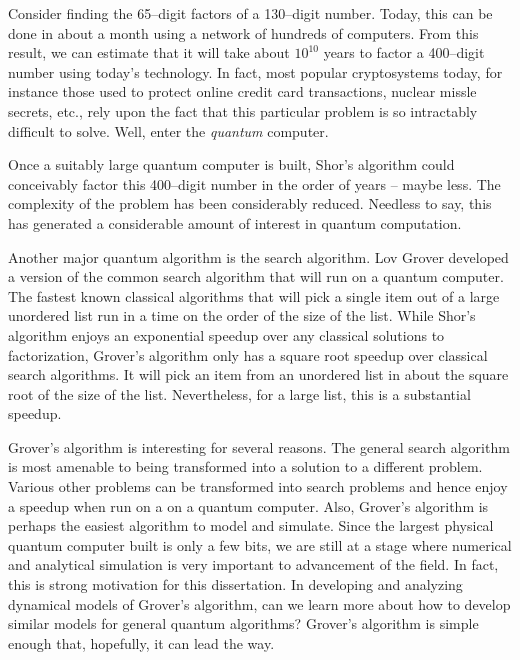 Consider finding the 65--digit factors of a 130--digit number.
Today, this can be done in about a month using a network of hundreds 
of computers.  From this result, we can estimate that it will take about 
$10^{10}$ years to factor a 400--digit number using today's technology.
In fact, most popular cryptosystems today, for instance those used to 
protect online credit card transactions, nuclear missle secrets, etc., 
rely upon the fact that this particular problem is so intractably 
difficult to solve.  Well, enter the {\sl quantum} computer.  

Once a suitably large quantum computer is built, Shor's algorithm could 
conceivably factor this 400--digit number in the order of years --
maybe less.  The complexity of the problem has been considerably reduced.
Needless to say, this has generated a considerable amount of interest in 
quantum computation.

Another major quantum algorithm is the search algorithm.  Lov
Grover\cite{Grover:96a} developed a version of the common
search
algorithm that will run on a quantum computer.  
The fastest known classical algorithms that will pick a single item out of
a large unordered list run in a time on the order of the size of the list.
While Shor's algorithm enjoys an exponential speedup over any classical 
solutions to factorization, Grover's algorithm only has a square root speedup
over classical search algorithms.  It will pick an item from an unordered
list in about the square root of the size of the list.  Nevertheless, for
a large list, this is a substantial speedup.

Grover's algorithm is interesting for several reasons.  The general search
algorithm is most amenable to being transformed into a solution to a different
problem.  Various other problems can be transformed into search problems and hence
enjoy a speedup when run on a on a quantum
computer\cite{Durr/Hoyer:96,Grover:96b,Grover:97,Brassard/Hoyer/Tapp:97,
Terhal/Smolin:98,Brassard/Hoyer/Tapp:98,Cerf/Grover/Williams:98,Farhi/Gutmann:98}.
Also, Grover's algorithm is perhaps the easiest algorithm to model and simulate.
Since the largest physical quantum computer built is only a few bits, we
are still at a stage where numerical and analytical simulation is very 
important to advancement of the field.  In fact, this is strong motivation
for this dissertation.  In developing and analyzing dynamical models of 
Grover's algorithm, can we learn more about how to develop similar models 
for general quantum algorithms?  Grover's algorithm is simple enough that,
hopefully, it can lead the way.

